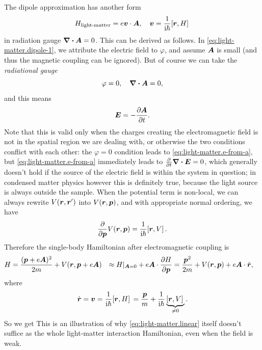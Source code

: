 \documentclass[hyperref, a4paper]{report}
\newcommand*{\ii}{\mathrm{i}}
\def\\{}%
\begin{document}
The dipole approximation has another form
\begin{equation}
    H_{\text{light-matter}} = e \vb*{v} \cdot \vb*{A}, 
    \quad \vb*{v} = \frac{1}{\ii \hbar} \comm*{\vb*{r}}{H} 
\end{equation}
in radiation gauge $\div{\vb*{A}} = 0$.
This can be derived as follows. 
In \eqref{eq:light-matter.dipole-1}, 
we attribute the electric field to $\varphi$, 
and assume $\vb*{A}$ is small (and thus the magnetic coupling can be ignored).
But of course we can take the \emph{radiational gauge} 
\begin{equation}
    \varphi = 0, \quad \div{\vb*{A}} = 0,
\end{equation} 
and this means 
\begin{equation}
    \vb*{E} = - \pdv{\vb*{A}}{t}.
    \label{eq:light-matter.e-from-a}
\end{equation}
Note that this is valid only when 
the charges creating the electromagnetic field 
is not in the spatial region we are dealing with,
or otherwise the two conditions conflict with each other: 
the $\varphi = 0$ condition leads to \eqref{eq:light-matter.e-from-a}, 
but \eqref{eq:light-matter.e-from-a} immediately leads to $\pdv{t} \div{\vb*{E}} = 0$, 
which generally doesn't hold if the source of the electric field 
is within the system in question; 
in condensed matter physics however this is definitely true, 
because the light source is always outside the sample.
When the potential term is non-local, 
we can always rewrite $V(\vb*{r}, \vb*{r}')$
into $V(\vb*{r}, \vb*{p})$,
and with appropriate normal ordering, we have 
\[
    \pdv{\vb*{p}} V(\vb*{r}, \vb*{p}) = \frac{1}{\ii \hbar} \comm*{\vb*{r}}{V}.
\]
Therefore the single-body Hamiltonian after electromagnetic coupling is 
\[
    \begin{aligned}
        H &= \frac{(\vb*{p} + e \vb*{A})^2}{2m} 
            + V(\vb*{r} , \vb*{p} + e \vb*{A}) \\
        &\approx H|_{\vb*{A} = 0} + 
            e \vb*{A} \cdot \pdv{H}{\vb*{p}} \\
        &= \frac{\vb*{p}^2}{2m} + V(\vb*{r}, \vb*{p}) + e \vb*{A} \cdot \dot{\vb*{r}},
    \end{aligned}
\]
where 
\begin{equation}
    \dot{\vb*{r}} = \vb*{v} = \frac{1}{\ii \hbar} \comm*{\vb*{r}}{H} 
    = \frac{\vb*{p}}{m} 
    + \frac{1}{\ii \hbar} \underbrace{\comm*{\vb*{r}}{V}}_{\neq 0}.
\end{equation}
So we get 
This is an illustration of 
why \eqref{eq:light-matter.linear} itself 
doesn't suffice as the whole light-matter interaction Hamiltonian, 
even when the field is weak.
\end{document}
